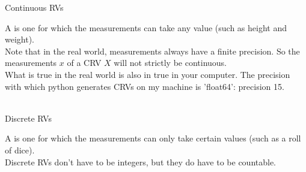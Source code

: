 \documentclass[10pt,sans,english,compress,xcolor=dvipsnames]{beamer}
\begin{document}
%
%
%
%
%




\begin{frame}[fragile]{Continuous RVs}

A   is one for which the measurements can take any value (such as height and weight).\\[2ex]
Note that in the real world, measurements always have a finite precision. So the measurements $x$ of a CRV $X$ will not strictly be continuous.\\[2ex]
What is true in the real world is also in true in your computer. The precision with which python generates CRVs on my machine is 'float64': precision 15.\\[2ex]
\\


\end{frame} 


\begin{frame}[fragile]{Discrete RVs}

A   is one for which the measurements can only take certain values (such as a roll of dice).\\[2ex]
Discrete RVs don't have to be integers, but they do have to be countable.\\[2ex]

 \\
 

\end{frame} 
\end{document}

